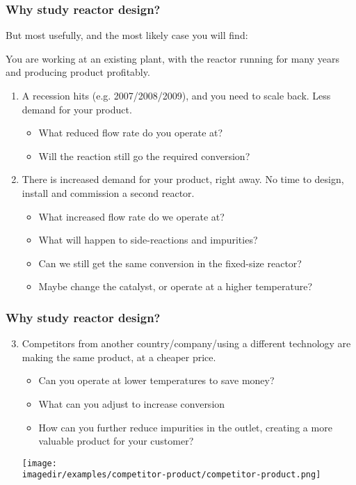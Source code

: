 \begin{frame}\frametitle{Why study reactor design?}
	But most usefully, and the most likely case you will find: 
	\begin{exampleblock}{}
		You are working at an existing plant, with the reactor running for many years and producing product profitably.
	\end{exampleblock}
	\vspace{12pt}
	\begin{enumerate}
		\item	A recession hits (e.g. 2007/2008/2009), and you need to scale back. Less demand for your product.
		\begin{itemize}
			\item	What reduced flow rate do you operate at?
			\item	Will the reaction still go the required conversion?
		\end{itemize}
		\vspace{12pt}
		\item	There is increased demand for your product, right away. No time to design, install and commission a second reactor.
		\begin{itemize}
			\item	What increased flow rate do we operate at?
			\item	What will happen to side-reactions and impurities?
			\item	Can we still get the same conversion in the fixed-size reactor?
			\item	Maybe change the catalyst, or operate at a higher temperature?
		\end{itemize}
	\end{enumerate}
\end{frame}

\begin{frame}\frametitle{Why study reactor design?}
	\begin{enumerate}
		\setcounter{enumi}{2}
		\item	Competitors from another country/company/using a different technology are making the same product, at a cheaper price.
		\begin{itemize}
			\item	Can you operate at lower temperatures to save money?
			\item	What can you adjust to increase conversion
			\item	How can you further reduce impurities in the outlet, creating a more valuable product for your customer?
		\end{itemize}
		\begin{center}
			\texttt{[image: \\imagedir/examples/competitor-product/competitor-product.png]}
		\end{center}
	\end{enumerate}
\end{frame}

